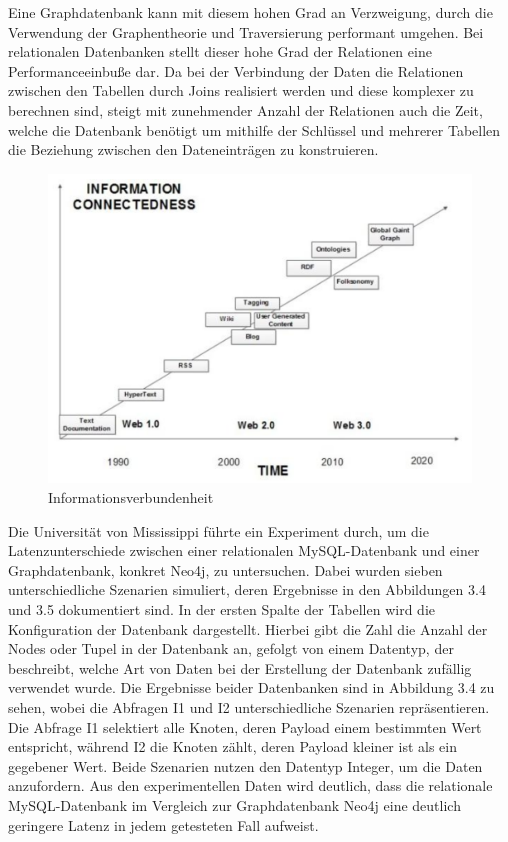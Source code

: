 \noindent
Eine Graphdatenbank kann mit diesem hohen Grad an Verzweigung, durch die Verwendung der Graphentheorie und Traversierung performant umgehen.  Bei relationalen Datenbanken stellt dieser hohe Grad der Relationen eine Performanceeinbuße dar.  Da bei der Verbindung der Daten die Relationen zwischen den Tabellen durch Joins realisiert werden und diese komplexer zu berechnen sind, steigt mit zunehmender Anzahl der Relationen auch die Zeit, welche die Datenbank benötigt um mithilfe der Schlüssel und mehrerer Tabellen die Beziehung zwischen den Dateneinträgen zu konstruieren. \citep{9677042} \citep{graphdb}
\begin{figure}[H]
	\centering
	\includegraphics[scale=.45]{Illustrations/informationconnectedness.png}
	\caption{Informationsverbundenheit \citep{performancenosql}}
\end{figure}
\noindent
Die Universität von Mississippi führte ein Experiment durch, um die Latenzunterschiede zwischen einer relationalen MySQL-Datenbank und einer Graphdatenbank, konkret Neo4j, zu untersuchen. Dabei wurden sieben unterschiedliche Szenarien simuliert, deren Ergebnisse in den Abbildungen 3.4 und 3.5 dokumentiert sind. In der ersten Spalte der Tabellen wird die Konfiguration der Datenbank dargestellt. Hierbei gibt die Zahl die Anzahl der Nodes oder Tupel in der Datenbank an, gefolgt von einem Datentyp, der beschreibt, welche Art von Daten bei der Erstellung der Datenbank zufällig verwendet wurde.
Die Ergebnisse beider Datenbanken sind in Abbildung 3.4 zu sehen, wobei die Abfragen I1 und I2 unterschiedliche Szenarien repräsentieren. Die Abfrage I1 selektiert alle Knoten, deren Payload einem bestimmten Wert entspricht, während I2 die Knoten zählt, deren Payload kleiner ist als ein gegebener Wert. Beide Szenarien nutzen den Datentyp Integer, um die Daten anzufordern. Aus den experimentellen Daten wird deutlich, dass die relationale MySQL-Datenbank im Vergleich zur Graphdatenbank Neo4j eine deutlich geringere Latenz in jedem getesteten  Fall aufweist.
